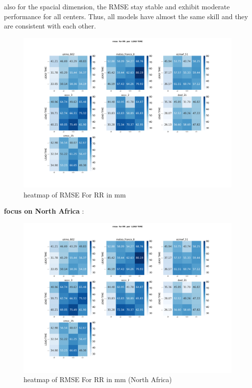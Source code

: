 also for the spacial dimension, the RMSE stay stable and exhibit moderate performance for all centers. Thus, all models have almost the same skill and they are consistent with each other.

\begin{figure}[H]
\centering
\includegraphics[scale=0.3]{plots/det/rmse/rmse_RR_mena.png}
\caption{heatmap of RMSE For RR in mm}
\end{figure}

\vspace{1.5cm}

\textbf{focus on North Africa} : 
\begin{figure}[H]
\centering
\includegraphics[scale=0.3]{plots/det/rmse/rmse_RR_mena.png}
\caption{heatmap of RMSE For RR in mm (North Africa)}
\end{figure}

